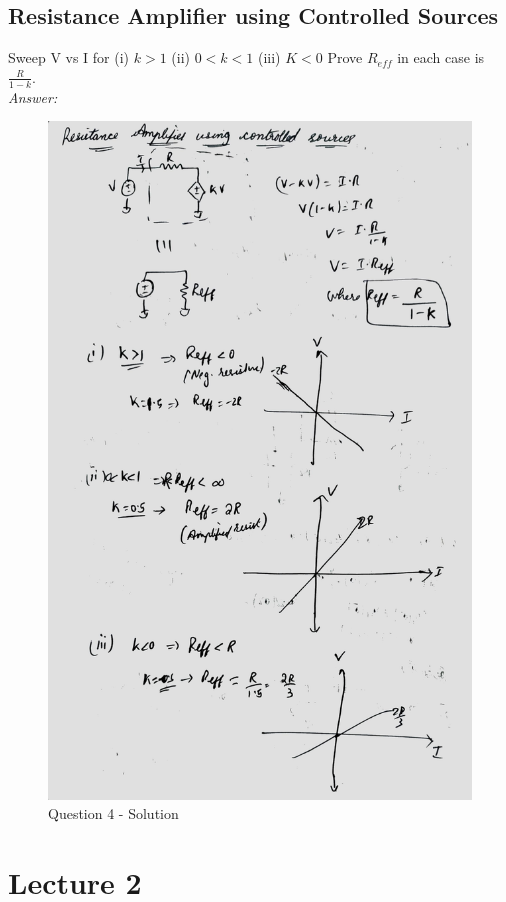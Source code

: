 \documentclass[a4paper]{article}
\begin{document}
\subsection{Resistance Amplifier using Controlled Sources}
Sweep V vs I for (i) $k>1$ (ii) $0<k<1$ (iii) $K<0$ Prove $R_{eff}$ in each case is $\frac{R}{1-k}$.\\
\textit{Answer: }\\
\begin{figure}
    \centering
    \includegraphics[width=1\linewidth]{images/Lec_1_Q4_Soln.jpeg}
    \caption{Question 4 - Solution}
\end{figure}

\section{Lecture 2}
\end{document}

